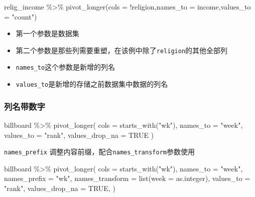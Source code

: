 \documentclass[
]{book}
\newenvironment{Shaded}{\begin{snugshade}}{\end{snugshade}}
\newcommand{\AttributeTok}[1]{\textcolor[rgb]{0.77,0.63,0.00}{#1}}
\newcommand{\ConstantTok}[1]{\textcolor[rgb]{0.00,0.00,0.00}{#1}}
\newcommand{\FunctionTok}[1]{\textcolor[rgb]{0.00,0.00,0.00}{#1}}
\newcommand{\NormalTok}[1]{#1}
\newcommand{\SpecialCharTok}[1]{\textcolor[rgb]{0.00,0.00,0.00}{#1}}
\newcommand{\StringTok}[1]{\textcolor[rgb]{0.31,0.60,0.02}{#1}}
\providecommand{\tightlist}{%
  \setlength{\itemsep}{0pt}\setlength{\parskip}{0pt}}
\begin{document}
\begin{Shaded}
\begin{Highlighting}[]
\NormalTok{relig\_income }\SpecialCharTok{\%\textgreater{}\%} 
  \FunctionTok{pivot\_longer}\NormalTok{(}\AttributeTok{cols =} \SpecialCharTok{!}\NormalTok{religion,}\AttributeTok{names\_to =} \StringTok{\textquotesingle{}income\textquotesingle{}}\NormalTok{,}\AttributeTok{values\_to =} \StringTok{"count"}\NormalTok{)}
\end{Highlighting}
\end{Shaded}

\begin{itemize}
\tightlist
\item
  第一个参数是数据集
\item
  第二个参数是那些列需要重塑，在该例中除了\texttt{religion}的其他全部列
\item
  \texttt{names\_to}这个参数是新增的列名
\item
  \texttt{values\_to}是新增的存储之前数据集中数据的列名
\end{itemize}

\hypertarget{ux5217ux540dux5e26ux6570ux5b57}{%
\subsubsection{列名带数字}\label{ux5217ux540dux5e26ux6570ux5b57}}

\begin{Shaded}
\begin{Highlighting}[]
\NormalTok{billboard }\SpecialCharTok{\%\textgreater{}\%} 
  \FunctionTok{pivot\_longer}\NormalTok{(}
    \AttributeTok{cols =} \FunctionTok{starts\_with}\NormalTok{(}\StringTok{"wk"}\NormalTok{), }
    \AttributeTok{names\_to =} \StringTok{"week"}\NormalTok{, }
    \AttributeTok{values\_to =} \StringTok{"rank"}\NormalTok{,}
    \AttributeTok{values\_drop\_na =} \ConstantTok{TRUE}
\NormalTok{  )}
\end{Highlighting}
\end{Shaded}

\texttt{names\_prefix} 调整内容前缀，配合\texttt{names\_transform}参数使用

\begin{Shaded}
\begin{Highlighting}[]
\NormalTok{billboard }\SpecialCharTok{\%\textgreater{}\%} 
  \FunctionTok{pivot\_longer}\NormalTok{(}
    \AttributeTok{cols =} \FunctionTok{starts\_with}\NormalTok{(}\StringTok{"wk"}\NormalTok{), }
    \AttributeTok{names\_to =} \StringTok{"week"}\NormalTok{, }
    \AttributeTok{names\_prefix =} \StringTok{"wk"}\NormalTok{,}
    \AttributeTok{names\_transform =} \FunctionTok{list}\NormalTok{(}\AttributeTok{week =}\NormalTok{ as.integer),}
    \AttributeTok{values\_to =} \StringTok{"rank"}\NormalTok{,}
    \AttributeTok{values\_drop\_na =} \ConstantTok{TRUE}\NormalTok{,}
\NormalTok{  )}
\end{Highlighting}
\end{Shaded}
\end{document}
